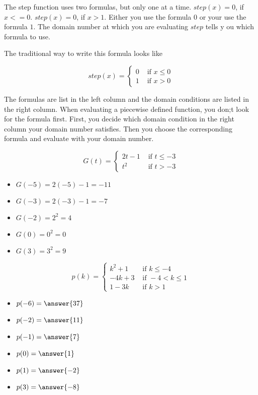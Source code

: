 \documentclass{ximera}
\begin{document}
The step function uses two formulas, but only one at a time.  $step(x) = 0$, if $x <= 0$. $step(x) = 0$, if $x > 1$.  Either you use the formula $0$ or your use the formula $1$.  The domain number at which you are evaluating $step$ tells y ou which formula to use.


The traditional way to write this formula looks like

\[
step(x) = 
\begin{cases}
  0 & \text{ if } x \leq 0 \\
  1 & \text{ if } x > 0
\end{cases}
\]

The formulas are list in the left column and the domain conditions are listed in the right column.  When evaluating a piecewise defined function, you don;t look for the formula first.  First, you decide which domain condition in the right column your domain number satisfies.  Then you choose the corresponding formula and evaluate with your domain number.



\begin{example}

\[
G(t) = 
\begin{cases}
  2t-1 & \text{ if } t \leq -3 \\
  t^2 & \text{ if } t > -3
\end{cases}
\]


\begin{itemize}
\item $G(-5) = 2(-5) - 1 = -11$  
\item $G(-3) = 2(-3) - 1 = -7$ 
\item $G(-2) = 2^2 = 4$ 
\item $G(0) = 0^2 = 0$ 
\item $G(3) = 3^2 = 9$ 
\end{itemize}

\end{example}




\begin{question}

\[
p(k) = 
\begin{cases}
  k^2 + 1 & \text{ if } k \leq -4 \\
  -4k + 3 & \text{ if } -4 < k \leq 1 \\
  1 - 3k & \text{ if } k > 1
\end{cases}
\]


\begin{itemize}
\item $p(-6) = \answer{37}$  
\item $p(-2) = \answer{11}$ 
\item $p(-1) = \answer{7}$ 
\item $p(0) = \answer{1}$ 
\item $p(1) = \answer{-2}$ 
\item $p(3) = \answer{-8}$ 
\end{itemize}

\end{question}
\end{document}
